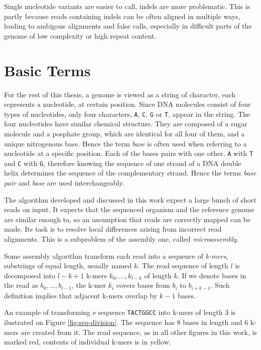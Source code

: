 Single nucleotide variants are easier to call, indels are more problematic. This is partly because reads containing indels can be often aligned in multiple ways,
leading to ambigous alignments and false calls, especially in difficult parts of
the genome of low complexity or high repeat content. 

\section{Basic Terms}
\label{sec:basic-terms}

For the rest of this thesis, a genome is viewed as a string of character, each represents a nucleotide, at certain position. Since DNA molecules consist of four types of nucleotides, only four characters, \texttt{A}, \texttt{C}, \texttt{G} or \texttt{T}, appear in the string. The four nucleotides have similar chemical structure. They are composed of a sugar molecule and a posphate group, which are identical for all four of them, and a unique nitrogenous base. Hence the term \textit{base} is often used when referring to a nucleotide at a specific position. Each of the bases pairs with one other, \texttt{A} with \texttt{T} and \texttt{C} with \texttt{G}, therefore knowing the sequence of one strand of a DNA double helix determines the sequence of the complementary strand. Hence the terms \textit{base pair} and \textit{base} are used interchangeably.

The algorithm developed and discussed in this work expect a large bunch of short reads on input. It expects that the sequenced organism and the reference genome are similar enough to, so an assumption that reads are correctly mapped can be made. Its task is to resolve local differences arising from incorrect read alignments. This is a subproblem of the assembly one, called \textit{microassembly}.

Some assembly algorithm transform each read into a sequence of \textit{k-mers}, substrings of equal length, usually named $k$. The read sequence of length $l$ is decomposed into $l - k + 1$ k-mers $k_0, ..., k_{l-k}$ of length $k$. If we denote bases in the read as $b_0, ..., b_{l-1}$, the k-mer $k_i$ covers bases from $b_i$ to $b_{i+k-1}$. Such definition implies that adjacent k-mers overlap by $k-1$ bases. 

An example of transforming e sequence \texttt{TACTGGCC} into k-mers of length $3$ is ilustrated on Figure \ref{fig:seq-division}. The sequence has $8$ bases in length and $6$ k-mers are created from it. The read sequence, as in all other figures in this work, is marked red, contents of individual k-mers is in yellow.

